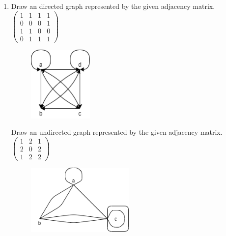 \documentclass[a4paper]{article}
\begin{document}
\begin{enumerate}
\begin{enumerate}[label=\textbf{\alph*)}]
			\begin{minipage}{0.5\textwidth}
				Incidence matrix:\\
				$\begin{blockarray}{ccccccccccc}
				& e1 & e2 & e3 & e4 & e5 & e6 & e7 & e8 & e9 & e10 \\
				\begin{block}{c(cccccccccc)}
				a & 1 & -1 & -1 & 0 & 1 & -1 & 0 & 0 & 0 & 0 \\
				b & 0 & 1 & 0 & 1 & 0 & 0 & 1 & -1 & 0 & 0 \\
				c & 0 & 0 & 0 & -1 & -1  & 1 & 0 & 0 & 1 & 0 \\
				d & 0 & 0 & 1 & 0 & 0 & 0 & -1 & 1 & -1 & 1 \\
				\end{block}
				\end{blockarray}$
			\end{minipage}
		\end{enumerate}
		\item Draw an directed graph represented by the given adjacency matrix.
		$\begin{pmatrix}
		1 & 1 & 1 & 1 \\
		0 & 0 & 0 & 1 \\
		1 & 1 & 0 & 0 \\
		0 & 1 & 1 & 1
		\end{pmatrix}$ \\
		\begin{figure}[H]
			\centering
			\includegraphics[width=0.3\textwidth]{gprob3_4.png}
		\end{figure}
		Draw an undirected graph represented by the given adjacency matrix.
		$\begin{pmatrix}
		1 & 2 & 1 \\
		2 & 0 & 2 \\
		1 & 2 & 2
		\end{pmatrix}$
		\begin{figure}[H]
			\centering
			\includegraphics[width=0.5\textwidth]{gprob3_5.png}

\end{figure}
\end{enumerate}
\end{document}
